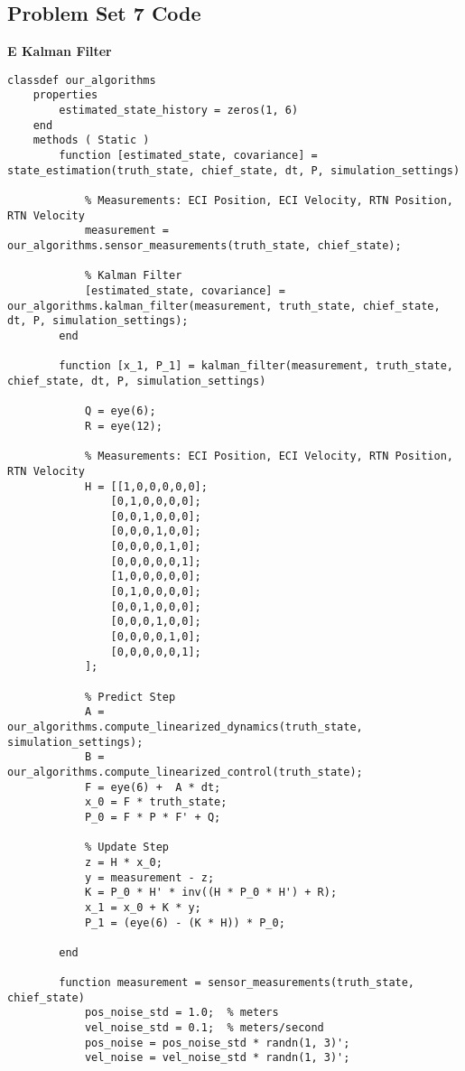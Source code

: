 \subsection{Problem Set 7 Code}

\textbf{E Kalman Filter}
\begin{lstlisting}
classdef our_algorithms
    properties
        estimated_state_history = zeros(1, 6)
    end
    methods ( Static )
        function [estimated_state, covariance] = state_estimation(truth_state, chief_state, dt, P, simulation_settings)
        
            % Measurements: ECI Position, ECI Velocity, RTN Position, RTN Velocity
            measurement = our_algorithms.sensor_measurements(truth_state, chief_state);
            
            % Kalman Filter
            [estimated_state, covariance] = our_algorithms.kalman_filter(measurement, truth_state, chief_state, dt, P, simulation_settings);
        end

        function [x_1, P_1] = kalman_filter(measurement, truth_state, chief_state, dt, P, simulation_settings)

            Q = eye(6);
            R = eye(12);

            % Measurements: ECI Position, ECI Velocity, RTN Position, RTN Velocity
            H = [[1,0,0,0,0,0];
                [0,1,0,0,0,0];
                [0,0,1,0,0,0];
                [0,0,0,1,0,0];
                [0,0,0,0,1,0];
                [0,0,0,0,0,1];
                [1,0,0,0,0,0];
                [0,1,0,0,0,0];
                [0,0,1,0,0,0];
                [0,0,0,1,0,0];
                [0,0,0,0,1,0];
                [0,0,0,0,0,1];
            ];

            % Predict Step
            A = our_algorithms.compute_linearized_dynamics(truth_state, simulation_settings);
            B = our_algorithms.compute_linearized_control(truth_state);
            F = eye(6) +  A * dt;
            x_0 = F * truth_state;
            P_0 = F * P * F' + Q;

            % Update Step
            z = H * x_0;
            y = measurement - z;
            K = P_0 * H' * inv((H * P_0 * H') + R);
            x_1 = x_0 + K * y;
            P_1 = (eye(6) - (K * H)) * P_0;
            
        end

        function measurement = sensor_measurements(truth_state, chief_state)
            pos_noise_std = 1.0;  % meters
            vel_noise_std = 0.1;  % meters/second
            pos_noise = pos_noise_std * randn(1, 3)';
            vel_noise = vel_noise_std * randn(1, 3)';


\end{lstlisting}
